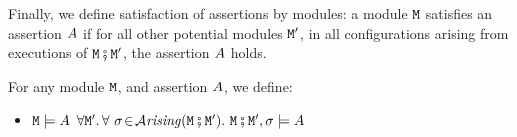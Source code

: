 Finally, we define satisfaction of assertions by modules: a module
${\mbox{\tt{\ensuremath{{\mbox{\tt{M}}}}}}}$ satisfies an assertion $A$ if for all other potential modules ${\mbox{\tt{\ensuremath{{\mbox{\tt{M}}}}}}}'$, in all configurations arising from executions of ${\mbox{\tt{\ensuremath{{\mbox{\tt{M}}}}}}}\fatsemi{\mbox{\tt{\ensuremath{{\mbox{\tt{M}}}}}}}'$, the assertion $A$ holds.

\begin{definition}
\label{def:module_satisfies}
For any module ${\mbox{\tt{\ensuremath{{\mbox{\tt{M}}}}}}}$, and  assertion $A$, we define:
\begin{itemize}
\item
${\mbox{\tt{\ensuremath{{\mbox{\tt{M}}}}}}} \models A$ \IFF  $\forall \M'.\, \forall \ \sigma\!\in\!\Arising{\M\mkpair\M'}.\   \M\mkpair\M', \sigma \models \A$
\end{itemize}
\end{definition}


 




